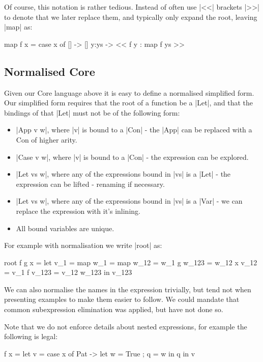 \documentclass{sigplanconf}
\begin{document}
Of course, this notation is rather tedious. Instead of often use |<<| brackets |>>| to denote that we later replace them, and typically only expand the root, leaving |map| as:

\begin{code}
map f x = case x of
    [] -> []
    y:ys -> << f y : map f ys >>
\end{code}


\subsection{Normalised Core}
\label{sec:simplify}

Given our Core language above it is easy to define a normalised simplified form. Our simplified form requires that the root of a function be a |Let|, and that the bindings of that |Let| must not be of the following form:

\begin{itemize}
\item |App v w|, where |v| is bound to a |Con| - the |App| can be replaced with a Con of higher arity.
\item |Case v w|, where |v| is bound to a |Con| - the expression can be explored.
\item |Let vs w|, where any of the expressions bound in |vs| is a |Let| - the expression can be lifted - renaming if necessary.
\item |Let vs w|, where any of the expressions bound in |vs| is a |Var| - we can replace the expression with it's inlining.
\item All bound variables are unique.
\end{itemize}

For example with normalisation we write |root| as:

\begin{code}
root f g x =
    let v_1 = map
        w_1 = map
        w_12 = w_1 g
        w_123 = w_12 x
        v_12 = v_1 f
        v_123 = v_12 w_123
    in v_123
\end{code}

We can also normalise the names in the expression trivially, but tend not when presenting examples to make them easier to follow. We could mandate that common subexpression elimination was applied, but have not done so.

Note that we do not enforce details about nested expressions, for example the following is legal:

\begin{code}
f x =
    let v = case x of
                Pat -> let w = True ; q = w in q
    in v
\end{code}
\end{document}
